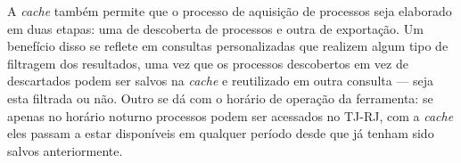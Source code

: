 A \textit{cache} também permite que o processo de aquisição de processos seja
elaborado em duas etapas: uma de descoberta de processos e outra de exportação.
Um benefício disso se reflete em consultas personalizadas que realizem algum
tipo de filtragem dos resultados, uma vez que os processos descobertos em vez
de descartados podem ser salvos na \textit{cache} e reutilizado em outra
consulta --- seja esta filtrada ou não. Outro se dá com o horário de operação
da ferramenta: se apenas no horário noturno processos podem ser acessados no
TJ-RJ, com a \textit{cache} eles passam a estar disponíveis em qualquer período
desde que já tenham sido salvos anteriormente.
